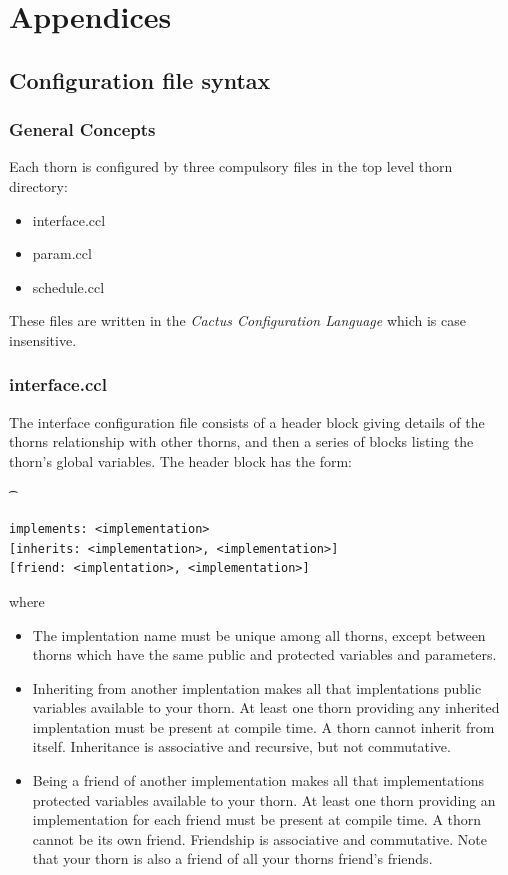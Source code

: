 \part{Appendices}

\appendix

\chapter{Configuration file syntax}
    
\section{General Concepts}

Each thorn is configured by three compulsory files in the top level thorn
directory:
\begin{itemize}
\item{} interface.ccl
\item{} param.ccl
\item{} schedule.ccl
\end{itemize}
These files are written in the {\it Cactus Configuration Language} which is
case insensitive.

\section{interface.ccl}

The interface configuration file consists of a header block giving details 
of the thorns relationship with other thorns, and then a series of blocks 
listing the thorn's global variables.
The header block has the form:
{\t 
\begin{verbatim}
implements: <implementation>
[inherits: <implementation>, <implementation>]
[friend: <implentation>, <implementation>]
\end{verbatim}
}
where
\begin{itemize}
\item{} The implentation name must be unique among all thorns, except between 
        thorns which have the same public and protected variables and 
        parameters.
\item{} Inheriting from another implentation makes all that implentations 
        public variables available to your thorn. At least one thorn 
        providing any inherited implentation must be present at compile time.
        A thorn cannot inherit from itself. Inheritance is associative and 
        recursive, but not commutative.
\item{} Being a friend of another implementation makes all that 
        implementations 
        protected variables available to your thorn. At least one thorn
        providing an implementation for each friend must be present at
        compile time. A thorn cannot be its own friend. Friendship is 
        associative and commutative. Note that your thorn is also a friend
        of all your thorns friend's friends.
\end{itemize} 

